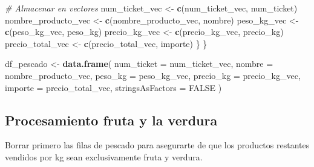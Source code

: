 \documentclass[,,,oneauthor,pdftex]{Definitions/mdpi}
\newenvironment{Shaded}{\begin{snugshade}}{\end{snugshade}}
\newcommand{\AttributeTok}[1]{\textcolor[rgb]{0.13,0.29,0.53}{#1}}
\newcommand{\CommentTok}[1]{\textcolor[rgb]{0.56,0.35,0.01}{\textit{#1}}}
\newcommand{\ConstantTok}[1]{\textcolor[rgb]{0.56,0.35,0.01}{#1}}
\newcommand{\ControlFlowTok}[1]{\textcolor[rgb]{0.13,0.29,0.53}{\textbf{#1}}}
\newcommand{\DecValTok}[1]{\textcolor[rgb]{0.00,0.00,0.81}{#1}}
\newcommand{\FunctionTok}[1]{\textcolor[rgb]{0.13,0.29,0.53}{\textbf{#1}}}
\newcommand{\NormalTok}[1]{#1}
\newcommand{\OtherTok}[1]{\textcolor[rgb]{0.56,0.35,0.01}{#1}}
\newcommand{\SpecialCharTok}[1]{\textcolor[rgb]{0.81,0.36,0.00}{\textbf{#1}}}
\newcommand{\StringTok}[1]{\textcolor[rgb]{0.31,0.60,0.02}{#1}}
\begin{document}
\begin{Shaded}
\begin{Highlighting}[]
    \CommentTok{\# Almacenar en vectores}
\NormalTok{    num\_ticket\_vec }\OtherTok{\textless{}{-}} \FunctionTok{c}\NormalTok{(num\_ticket\_vec, num\_ticket)}
\NormalTok{    nombre\_producto\_vec }\OtherTok{\textless{}{-}} \FunctionTok{c}\NormalTok{(nombre\_producto\_vec, nombre)}
\NormalTok{    peso\_kg\_vec }\OtherTok{\textless{}{-}} \FunctionTok{c}\NormalTok{(peso\_kg\_vec, peso\_kg)}
\NormalTok{    precio\_kg\_vec }\OtherTok{\textless{}{-}} \FunctionTok{c}\NormalTok{(precio\_kg\_vec, precio\_kg)}
\NormalTok{    precio\_total\_vec }\OtherTok{\textless{}{-}} \FunctionTok{c}\NormalTok{(precio\_total\_vec, importe)}
\NormalTok{  \}}
\NormalTok{\}}

\NormalTok{df\_pescado }\OtherTok{\textless{}{-}} \FunctionTok{data.frame}\NormalTok{(}
  \AttributeTok{num\_ticket =}\NormalTok{ num\_ticket\_vec,}
  \AttributeTok{nombre =}\NormalTok{ nombre\_producto\_vec,}
  \AttributeTok{peso\_kg =}\NormalTok{ peso\_kg\_vec,}
  \AttributeTok{precio\_kg =}\NormalTok{ precio\_kg\_vec,}
  \AttributeTok{importe =}\NormalTok{ precio\_total\_vec,}
  \AttributeTok{stringsAsFactors =} \ConstantTok{FALSE}
\NormalTok{)}
\end{Highlighting}
\end{Shaded}

\hypertarget{procesamiento-fruta-y-la-verdura}{%
\subsection{Procesamiento fruta y la
verdura}\label{procesamiento-fruta-y-la-verdura}}

Borrar primero las filas de pescado para asegurarte de que los productos
restantes vendidos por kg sean exclusivamente fruta y verdura.

\begin{Shaded}
\end{Shaded}
\end{document}
